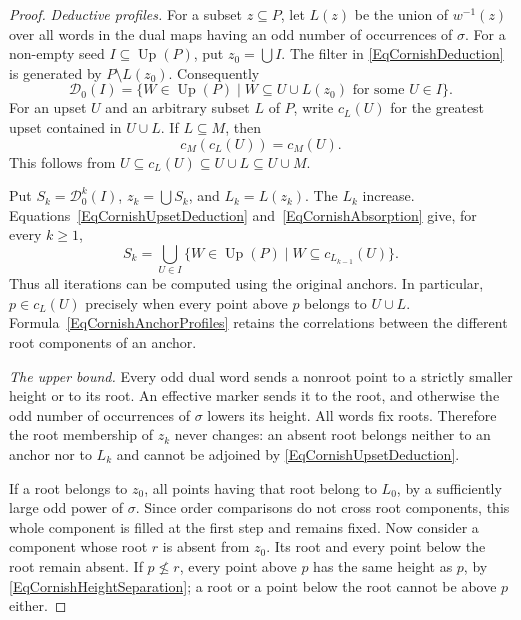 \documentclass[12pt,english]{amsart}
\theoremstyle{definition}
\numberwithin{equation}{section}
\theoremstyle{remark}
\begin{document}
\begin{proof}
\emph{Deductive profiles.}
For a subset $z\subseteq P$, let $L(z)$ be the union of $w^{-1}(z)$
over all words in the dual maps having an odd number of occurrences
of $\sigma$. For a non-empty seed $I\subseteq\operatorname{Up}(P)$,
put $z_0=\bigcup I$. The filter in
\eqref{EqCornishDeduction} is generated by $P\setminus L(z_0)$.
Consequently
\begin{equation}\label{EqCornishUpsetDeduction}
\mathcal D_0(I)=
\{W\in\operatorname{Up}(P)\mid W\subseteq U\cup L(z_0)
                              \text{ for some }U\in I\}.
\end{equation}
For an upset $U$ and an arbitrary subset $L$ of $P$, write $c_L(U)$
for the greatest upset contained in $U\cup L$. If $L\subseteq M$,
then
\begin{equation}\label{EqCornishAbsorption}
c_M(c_L(U))=c_M(U).
\end{equation}
This follows from $U\subseteq c_L(U)\subseteq U\cup L\subseteq U\cup M$.

Put $S_k=\mathcal D_0^k(I)$, $z_k=\bigcup S_k$, and $L_k=L(z_k)$.
The $L_k$ increase. Equations~\eqref{EqCornishUpsetDeduction}
and~\eqref{EqCornishAbsorption} give, for every $k\geqslant1$,
\begin{equation}\label{EqCornishAnchorProfiles}
S_k=\bigcup_{U\in I}
\{W\in\operatorname{Up}(P)\mid W\subseteq c_{L_{k-1}}(U)\}.
\end{equation}
Thus all iterations can be computed using the original anchors.
In particular, $p\in c_L(U)$ precisely when every point above $p$
belongs to $U\cup L$. Formula~\eqref{EqCornishAnchorProfiles} retains
the correlations between the different root components of an anchor.

\emph{The upper bound.}
Every odd dual word sends a nonroot point to a strictly smaller height
or to its root. An effective marker sends it to the root, and otherwise
the odd number of occurrences of $\sigma$ lowers its height. All words
fix roots. Therefore the root membership of $z_k$ never changes:
an absent root belongs neither to an anchor nor to $L_k$ and cannot
be adjoined by \eqref{EqCornishUpsetDeduction}.

If a root belongs to $z_0$, all points having that root belong to
$L_0$, by a sufficiently large odd power of $\sigma$. Since order
comparisons do not cross root components, this whole component is
filled at the first step and remains fixed. Now consider a component
whose root $r$ is absent from $z_0$. Its root and every point below
the root remain absent. If $p\nleqslant r$, every point above $p$
has the same height as $p$, by \eqref{EqCornishHeightSeparation};
a root or a point below the root cannot be above $p$ either.


\end{proof}
\end{document}
